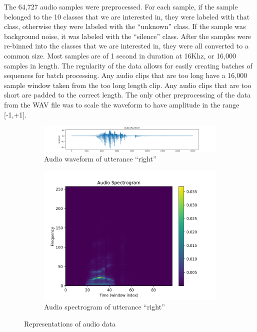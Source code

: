 \documentclass{article}
\begin{document}
The 64,727 audio samples were preprocessed. For each sample, if the
sample belonged to the 10 classes that we are interested in, they were
labeled with that class, otherwise they were labeled with the
``unknown'' class. If the sample was background noise, it was labeled
with the ``silence'' class. After the samples were re-binned into the
classes that we are interested in, they were all converted to a common
size. Most samples are of 1 second in duration at 16Khz, or 16,000
samples in length. The regularity of the data allows for easily
creating batches of sequences for batch processing. Any audio clips
that are too long have a 16,000 sample window taken from the too long
length clip. Any audio clips that are too short are padded to the correct
length. The only other preprocessing of the data from the WAV file was
to scale the waveform to have amplitude in the range [-1,+1].

\begin{figure}
  \begin{subfigure}{.5\linewidth}
    \includegraphics[width=\linewidth]{images/waveform-right}
    \caption{Audio waveform of utterance ``right''}
    \label{fig:wave_right}
  \end{subfigure}%
  \begin{subfigure}{.5\linewidth}
    \includegraphics[width=0.8\linewidth]{images/spectrogram-right}
    \caption{Audio spectrogram of utterance ``right''}
    \label{fig:spec_right}
  \end{subfigure}
  \caption{Representations of audio data}
\end{figure}
\end{document}
